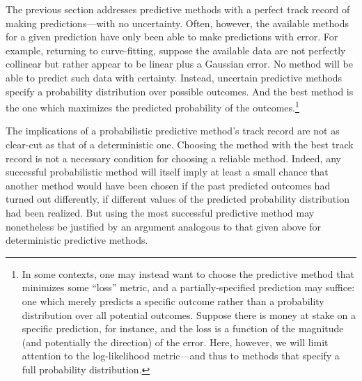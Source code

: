 \documentclass[
  letterpaper,
  DIV=11,
  numbers=noendperiod]{scrartcl}
\newcounter{none} %
\theoremstyle{definition}
\theoremstyle{remark}
\begin{document}
The previous section addresses predictive methods with a perfect track
record of making predictions---with no uncertainty. Often, however, the
available methods for a given prediction have only been able to make
predictions with error. For example, returning to curve-fitting, suppose
the available data are not perfectly collinear but rather appear to be
linear plus a Gaussian error. No method will be able to predict such
data with certainty. Instead, uncertain predictive methods specify a
probability distribution over possible outcomes. And the best method is
the one which maximizes the predicted probability of the
outcomes.\footnote{In some contexts, one may instead want to choose the
  predictive method that minimizes some ``loss'' metric, and a
  partially-specified prediction may suffice: one which merely predicts
  a specific outcome rather than a probability distribution over all
  potential outcomes. Suppose there is money at stake on a specific
  prediction, for instance, and the loss is a function of the magnitude
  (and potentially the direction) of the error. Here, however, we will
  limit attention to the log-likelihood metric---and thus to methods
  that specify a full probability distribution.}

The implications of a probabilistic predictive method's track record are
not as clear-cut as that of a deterministic one. Choosing the method
with the best track record is not a necessary condition for choosing a
reliable method. Indeed, any successful probabilistic method will itself
imply at least a small chance that another method would have been chosen
if the past predicted outcomes had turned out differently, if different
values of the predicted probability distribution had been realized. But
using the most successful predictive method may nonetheless be justified
by an argument analogous to that given above for deterministic
predictive methods.
\end{document}
